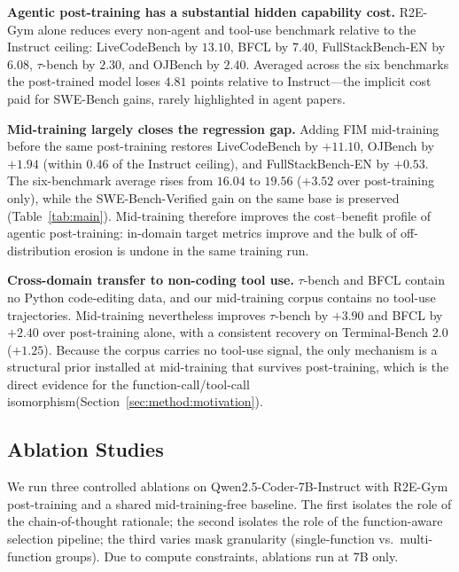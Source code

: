 \textbf{Agentic post-training has a substantial hidden capability cost.}
R2E-Gym alone reduces every non-agent and tool-use benchmark relative to
the Instruct ceiling: LiveCodeBench by $13.10$, BFCL by $7.40$,
FullStackBench-EN by $6.08$, $\tau$-bench by $2.30$, and OJBench by
$2.40$. Averaged across the six benchmarks the post-trained model loses
$4.81$ points relative to Instruct---the implicit cost paid for
SWE-Bench gains, rarely highlighted in agent papers.

\textbf{Mid-training largely closes the regression gap.}
Adding FIM mid-training before the same post-training restores
LiveCodeBench by $+11.10$, OJBench by $+1.94$ (within $0.46$ of the
Instruct ceiling), and FullStackBench-EN by $+0.53$. The six-benchmark
average rises from $16.04$ to $19.56$ ($+3.52$ over post-training only),
while the SWE-Bench-Verified gain on the same base is preserved
(Table~\ref{tab:main}). Mid-training therefore improves the
cost--benefit profile of agentic post-training: in-domain target
metrics improve and the bulk of off-distribution erosion is undone in
the same training run.

\textbf{Cross-domain transfer to non-coding tool use.}
$\tau$-bench and BFCL contain no Python code-editing data, and our
mid-training corpus contains no tool-use trajectories. Mid-training
nevertheless improves $\tau$-bench by $+3.90$ and BFCL by $+2.40$ over
post-training alone, with a consistent recovery on
Terminal-Bench 2.0 ($+1.25$). Because the corpus carries no tool-use signal, the only mechanism is a
structural prior installed at mid-training that survives post-training, which is the direct evidence for the function-call/tool-call isomorphism(Section~\ref{sec:method:motivation}).


\vspace{-0.5ex}
\subsection{Ablation Studies}
\label{sec:exp:ablation}

We run three controlled ablations on Qwen2.5-Coder-7B-Instruct with
R2E-Gym post-training and a shared mid-training-free baseline. The first
isolates the role of the chain-of-thought rationale; the second isolates
the role of the function-aware selection pipeline; the third varies
mask granularity (single-function vs.\ multi-function groups). Due to
compute constraints, ablations run at 7B only.

